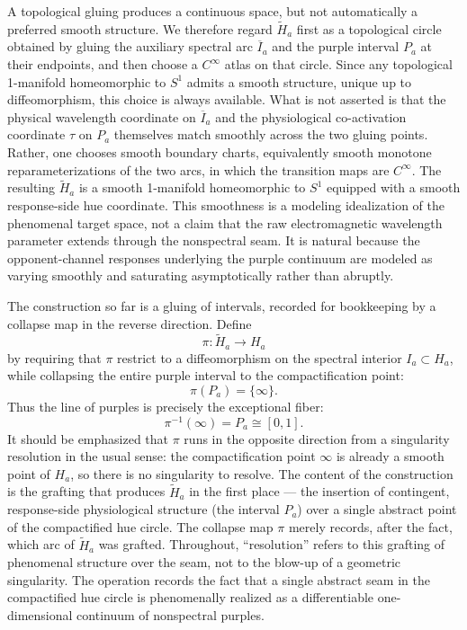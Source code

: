 \documentclass[preprint,12pt,authoryear]{elsarticle}
\theoremstyle{plain}
\theoremstyle{definition}
\theoremstyle{remark}
\begin{document}
A topological gluing produces a continuous space, but not automatically a preferred smooth structure. We therefore regard $\widetilde H_a$ first as a topological circle obtained by gluing the auxiliary spectral arc $\overline I_a$ and the purple interval $P_a$ at their endpoints, and then choose a $C^\infty$ atlas on that circle. Since any topological 1-manifold homeomorphic to $S^1$ admits a smooth structure, unique up to diffeomorphism, this choice is always available. What is not asserted is that the physical wavelength coordinate on $\overline I_a$ and the physiological co-activation coordinate $\tau$ on $P_a$ themselves match smoothly across the two gluing points. Rather, one chooses smooth boundary charts, equivalently smooth monotone reparameterizations of the two arcs, in which the transition maps are $C^\infty$. The resulting $\widetilde H_a$ is a smooth 1-manifold homeomorphic to $S^1$ equipped with a smooth response-side hue coordinate. This smoothness is a modeling idealization of the phenomenal target space, not a claim that the raw electromagnetic wavelength parameter extends through the nonspectral seam. It is natural because the opponent-channel responses underlying the purple continuum are modeled as varying smoothly and saturating asymptotically rather than abruptly.

The construction so far is a gluing of intervals, recorded for bookkeeping by a collapse map in the reverse direction. Define
\[
\pi:\widetilde H_a\longrightarrow H_a
\]
by requiring that $\pi$ restrict to a diffeomorphism on the spectral interior $I_a\subset H_a$, while collapsing the entire purple interval to the compactification point:
\[
\pi(P_a)=\{\infty\}.
\]
Thus the line of purples is precisely the exceptional fiber:
\[
\pi^{-1}(\infty)=P_a\cong[0,1].
\]
It should be emphasized that $\pi$ runs in the opposite direction from a singularity resolution in the usual sense: the compactification point $\infty$ is already a smooth point of $H_a$, so there is no singularity to resolve. The content of the construction is the grafting that produces $\widetilde H_a$ in the first place --- the insertion of contingent, response-side physiological structure (the interval $P_a$) over a single abstract point of the compactified hue circle. The collapse map $\pi$ merely records, after the fact, which arc of $\widetilde H_a$ was grafted. Throughout, ``resolution'' refers to this grafting of phenomenal structure over the seam, not to the blow-up of a geometric singularity. The operation records the fact that a single abstract seam in the compactified hue circle is phenomenally realized as a differentiable one-dimensional continuum of nonspectral purples.
\end{document}
